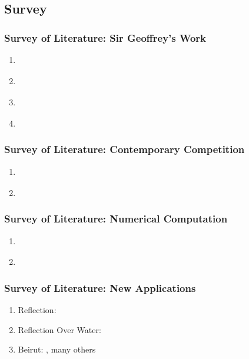 % 

\subsection{Survey}
\begin{frame}\frametitle{Survey of Literature: Sir Geoffrey's Work}
\begin{enumerate}
	\item \href{https://royalsocietypublishing.org/doi/abs/10.1098/rspa.1946.0044}{\textcite{taylor1946air}}
	\item \href{https://royalsocietypublishing.org/doi/abs/10.1098/rspa.1950.0023}{\textcite{davies1950mechanics}}
	\item \textcite{taylor1950formationI}
	\item \textcite{taylor1950formationII}
\end{enumerate}
\end{frame}

\begin{frame}\frametitle{Survey of Literature: Contemporary Competition}
\begin{enumerate}
	\item \textcite{bethe1947blast}
	\item \textcite{goldstine1955blast}
\end{enumerate}
\end{frame}

\begin{frame}\frametitle{Survey of Literature: Numerical Computation}
\begin{enumerate}
	\item \textcite{bethe1947blast}
	\item \textcite{goldstine1955blast}
\end{enumerate}
\end{frame}

\begin{frame}\frametitle{Survey of Literature: New Applications}
\begin{enumerate}
	\item Reflection: \cite{myers2020new}
	\item Reflection Over Water: \cite{cook2021reflection}
	\item Beirut: \cite{aouad2021beirut}, many others
\end{enumerate}
\end{frame}

